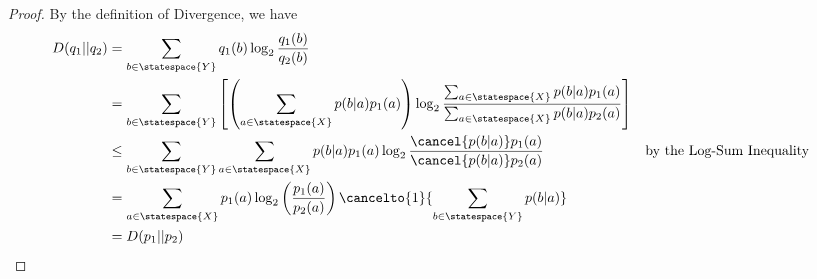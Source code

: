 \documentclass[
  coursecode={MTHE 474},
  assignmentname={Homework \homeworknumber},
  studentnumber=20053722,
  name={Bryan Hoang}
]{
  ltxanswer%
}
\begin{document}
\begin{questions}
\begin{solution}
\begin{parts}
        \part{}
        \begin{proof}
          By the definition of Divergence, we have
          \begin{align*}
            D(q_{1}||q_{2}) &= \sum_{b\in\statespace{Y}} q_{1}(b)\log_{2}\frac{q_{1}(b)}{q_{2}(b)}                                                                                                                                                            \\
                            &= \sum_{b\in\statespace{Y}} \left[\left(\sum_{a\in\statespace{X}}p(b|a)p_{1}(a)\right)\log_{2}\frac{\sum_{a\in\statespace{X}}p(b|a)p_{1}(a)}{\sum_{a\in\statespace{X}}p(b|a)p_{2}(a)}\right]                                     \\
                            &\le \sum_{b\in\statespace{Y}} \sum_{a\in\statespace{X}}p(b|a)p_{1}(a) \log_{2} \frac{\cancel{p(b|a)}p_{1}(a)}{\cancel{p(b|a)}p_{2}(a)}                                                       & &\text{by the Log-Sum Inequality} \\
                            &= \sum_{a\in\statespace{X}} p_{1}(a) \log_{2} \left(\frac{p_{1}(a)}{p_{2}(a)}\right) \cancelto{1}{\sum_{b\in\statespace{Y}} p(b|a)}                                                                                              \\
                            &= D(p_{1}||p_{2})
          \end{align*}
        \end{proof}
      \end{parts}
    \end{solution}
  \end{questions}
\end{document}
